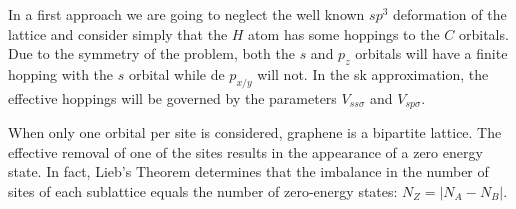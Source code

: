 In a first approach we are going to neglect the well known $sp^3$ deformation of the lattice\cite{} and consider simply that the $H$ atom has some hoppings to the $C$ orbitals. Due to the symmetry of the problem, both the $s$ and $p_z$ orbitals will have a finite hopping with the $s$ orbital while de $p_{x/y}$ will not. In the \ac{sk} approximation, the effective hoppings will be governed by the parameters $V_{ss\sigma}$ and $V_{sp\sigma}$.


%
%
%
%
%
%
%
%
%


When only one orbital per site is considered, graphene is a bipartite lattice. The effective removal of one of the sites results in the appearance of a zero energy state. In fact, Lieb's Theorem\cite{Lieb1989} determines that the imbalance in the number of sites of each sublattice equals the number of zero-energy states: $N_Z=|N_A-N_B|$.

